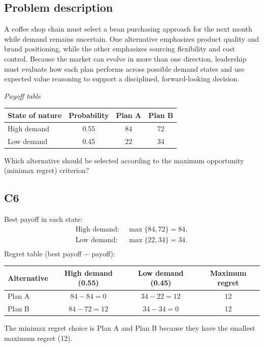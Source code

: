 \begin{ExamProblems}
		\subsection*{Problem description}
		A coffee shop chain must select a bean purchasing approach for the next month while demand remains uncertain. One alternative emphasizes product quality and brand positioning, while the other emphasizes sourcing flexibility and cost control. Because the market can evolve in more than one direction, leadership must evaluate how each plan performs across possible demand states and use expected value reasoning to support a disciplined, forward-looking decision.

		\begin{center}
			\textit{Payoff table} \par
			\begin{tabular}{l c c c}
				\toprule
				State of nature & Probability & Plan A & Plan B \\
				\midrule
				High demand & 0.55 & 84 & 72 \\
				Low demand & 0.45 & 22 & 34 \\
				\bottomrule
			\end{tabular}
		\end{center}

		Which alternative should be selected according to the maximum opportunity (minimax regret) criterion?

		\subsection*{C6}
		Best payoff in each state:
		\[
		\begin{aligned}
			\text{High demand: } &\max\{84, 72\} = 84, \\
			\text{Low demand: } &\max\{22, 34\} = 34. \\
		\end{aligned}
		\]
		Regret table (best payoff $-$ payoff):
		\begin{center}
			\begin{tabular}{l c c c}
				\toprule
				Alternative & High demand (0.55) & Low demand (0.45) & Maximum regret \\
				\midrule
				Plan A & $84-84=0$ & $34-22=12$ & 12 \\
				Plan B & $84-72=12$ & $34-34=0$ & 12 \\
				\bottomrule
			\end{tabular}
		\end{center}
		The minimax regret choice is Plan A and Plan B because they have the smallest maximum regret (12).
		\item

\end{ExamProblems}
